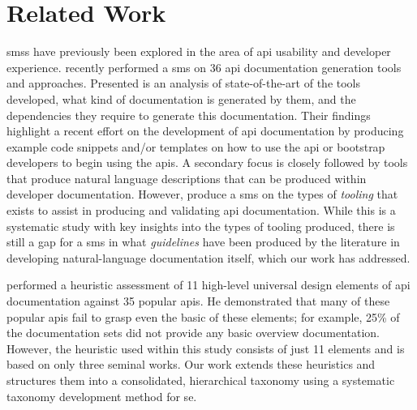 \section{Related Work}
\label{esem2019:sec:related-work}

\Glspl{sms} have previously been explored in the area of \gls{api} usability and developer experience. \citet{Nybom:2018ef} recently performed a \gls{sms} on 36 \gls{api} documentation generation tools and approaches. Presented is an analysis of state-of-the-art of the tools developed, what kind of documentation is generated by them, and the dependencies they require to generate this documentation. Their findings highlight a recent effort on the development of \gls{api} documentation by producing example code snippets and/or templates on how to use the \gls{api} or bootstrap developers to begin using the \glspl{api}. A secondary focus is closely followed by tools that produce natural language descriptions that can be produced within developer documentation. %
However, \citeauthor{Nybom:2018ef} produce a \gls{sms} on the types of \textit{tooling} that exists to assist in producing and validating \gls{api} documentation. While this is a systematic study with key insights into the types of tooling produced, there is still a gap for a \gls{sms} in what \textit{guidelines} have been produced by the literature in developing natural-language documentation itself, which our work has addressed.

\citet{Watson:2012uy} performed a heuristic assessment of 11 high-level universal design elements of \gls{api} documentation against 35 popular \glspl{api}. He demonstrated that many of these popular \glspl{api} fail to grasp even the basic of these elements; for example, 25\% of the documentation sets did not provide any basic overview documentation. However, the heuristic used within this study consists of just 11 elements and is based on only three seminal works. Our work extends these heuristics and structures them into a consolidated, hierarchical taxonomy using a systematic taxonomy development method for \gls{se}.

